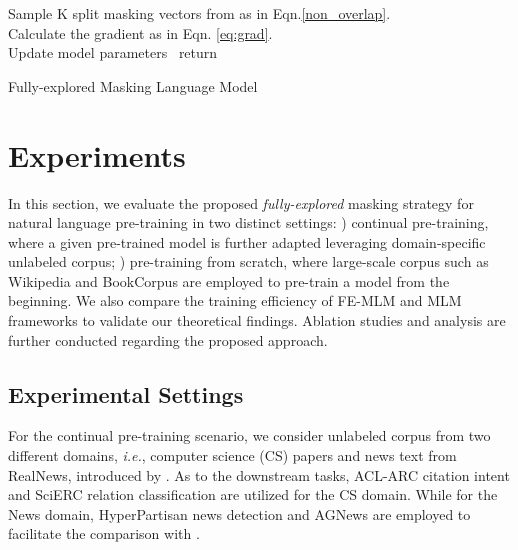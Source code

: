 \documentclass{article} \usepackage{iclr2021_conference,times}
\theoremstyle{plain}
\begin{document}
\begin{algorithm}[H]
\SetAlgoLined
{}
\ForEach {} 
 { \hspace{0.0cm}Sample K split masking vectors  from  as in Eqn.\ref{non_overlap}. \\Calculate the gradient  as in Eqn. \ref{eq:grad}. \\Update model parameters  }\
{return }
\label{alg:msk}
\caption{Fully-explored Masking Language Model}
\end{algorithm}


















\vspace{-2mm}
\section{Experiments}
\vspace{-3mm}
In this section, we evaluate the proposed \emph{fully-explored} masking strategy for natural language pre-training in two distinct settings: 
\emph{\romannumeral1}) continual pre-training, where a given pre-trained model is further adapted leveraging domain-specific unlabeled corpus;
\emph{\romannumeral2}) pre-training from scratch, where large-scale corpus such as Wikipedia and BookCorpus are employed to pre-train a model from the beginning.
We also compare the training efficiency of FE-MLM and MLM frameworks to validate our theoretical findings.
Ablation studies and analysis are further conducted regarding the proposed approach.

\vspace{-4mm}
\subsection{Experimental Settings}
\vspace{-3mm}
For the continual pre-training scenario, we consider unlabeled corpus from two different domains, \emph{i.e.}, computer science (CS) papers and news text from RealNews, introduced by \cite{gururangan2020don}. As to the downstream tasks, ACL-ARC citation intent \cite{Jurgens2018MeasuringTE} and SciERC relation classification \cite{Luan2018MultiTaskIO} are utilized for the CS domain. While for the News domain, HyperPartisan news detection \cite{kiesel2019semeval} and AGNews \cite{zhang2015character} are employed to facilitate the comparison with \cite{gururangan2020don}. 
\end{document}
